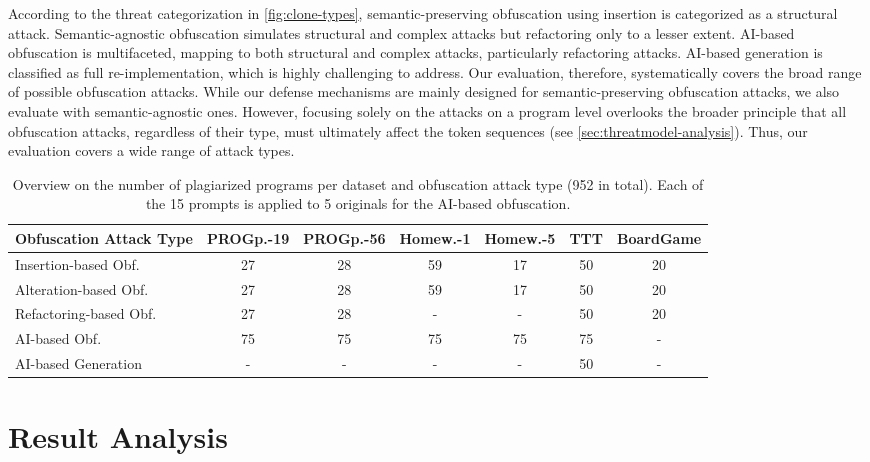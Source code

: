 %
According to the threat categorization in \autoref{fig:clone-types}, semantic-preserving obfuscation using insertion is categorized as a structural attack. Semantic-agnostic obfuscation simulates structural and complex attacks but refactoring only to a lesser extent. AI-based obfuscation is multifaceted, mapping to both structural and complex attacks, particularly refactoring attacks. AI-based generation is classified as full re-implementation, which is highly challenging to address. Our evaluation, therefore, systematically covers the broad range of possible obfuscation attacks. While our defense mechanisms are mainly designed for semantic-preserving obfuscation attacks, we also evaluate with semantic-agnostic ones.
%
However, focusing solely on the attacks on a program level overlooks the broader principle that all obfuscation attacks, regardless of their type, must ultimately affect the token sequences (see \autoref{sec:threatmodel-analysis}). Thus, our evaluation covers a wide range of attack types.
%
\begin{table}[b]
	\centering
    \small
    \setlength{\tabcolsep}{5pt}
	\begin{tabular}{lcccccc}
		\toprule
		Obfuscation Attack Type  & PROGp.-19 & PROGp.-56 & Homew.-1 & Homew.-5 & TTT & BoardGame\\
		\midrule
		Insertion-based Obf. & 27    & 28    & 59   & 17   & 50 & 20 \\
		Alteration-based Obf.   & 27    & 28    & 59   & 17   & 50 & 20 \\
        Refactoring-based Obf.   & 27    & 28    & -   & -  & 50 & 20 \\
		AI-based Obf. & 75    & 75    & 75   & 75   & 75 & - \\
		AI-based Generation      & -     & -     & -    & -    & 50 & -\\
		\bottomrule
	\end{tabular}
    \caption[Obfuscation Attacks]{Overview on the number of plagiarized programs per dataset and obfuscation attack type (952 in total). Each of the 15 prompts is applied to 5 originals for the AI-based obfuscation.}
    \label{tab:plagiate}
\end{table}

\section{Result Analysis}

